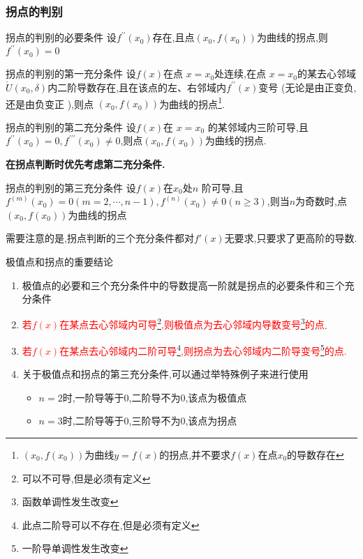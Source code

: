 \documentclass[8pt a4paper, oneside, UTF8]{ctexbook}  %
\begin{document}
\begin{sloppypar}
    \subsubsection{拐点的判别}
    \begin{defn}{拐点的判别的必要条件}{}
        设$f^{\prime\prime}(x_0)$存在,且点$(x_0,f(x_0))$为曲线的拐点,则$f^{\prime\prime}(x_0)=0$
    \end{defn}
    \begin{defn}{拐点的判别的第一充分条件}{}
        设$f(x)$在点 $x=x_0$处连续,在点 $x=x_0$的某去心邻域$\mathring U(x_0,\delta)$内二阶导数存在,且在该点的左、右邻域内$f^{\prime\prime}(x)$变号 (无论是由正变负,还是由负变正 ),则点 $(x_0,f(x_0))$为曲线的拐点\footnote{$(x_0,f(x_0))$为曲线$y=f(x)$的拐点,并不要求$f(x)$在点$x_0$的导数存在}.
    \end{defn}
    \begin{defn}{拐点的判别的第二充分条件}{}
        设$f(x)$在 $x=x_0$ 的某邻域内三阶可导,且$f^{\prime\prime}(x_0)=0,f^{\prime\prime\prime}(x_0)\neq0$,则点$(x_0,f(x_0))$为曲线的拐点.
    \end{defn}
    \textbf{在拐点判断时优先考虑第二充分条件.}
    \begin{defn}{拐点的判别的第三充分条件}{}
        设$f(x)$在$x_0$处$n$ 阶可导,且$f^{(m)}(x_0)=0(m=2,\cdots,n-1),f^{(n)}(x_0)\neq0(n\geqslant3)$,则当$n$为奇数时,点$(x_0,f(x_0))$为曲线的拐点
    \end{defn}
    需要注意的是,拐点判断的三个充分条件都对$f'(x)$无要求,只要求了更高阶的导数.
    \begin{conclusion}{极值点和拐点的重要结论}{}
        \begin{enumerate}
            \item 极值点的必要和三个充分条件中的导数提高一阶就是拐点的必要条件和三个充分条件
            \item \textcolor{red}{若$f(x)$在某点去心邻域内可导\footnote{可以不可导,但是必须有定义},则极值点为去心邻域内导数变号\footnote{函数单调性发生改变}的点}.
            \item \textcolor{red}{若$f(x)$在某点去心邻域内二阶可导\footnote{此点二阶导可以不存在,但是必须有定义},则拐点为去心邻域内二阶导变号\footnote{一阶导单调性发生改变}的点.}
            \item 关于极值点和拐点的第三充分条件,可以通过举特殊例子来进行使用
                  \begin{itemize}
                      \item $n=2$时,一阶导等于0,二阶导不为0,该点为极值点
                      \item $n=3$时,二阶导等于0,三阶导不为0,该点为拐点

\end{itemize}
\end{enumerate}
\end{conclusion}
\end{sloppypar}
\end{document}
